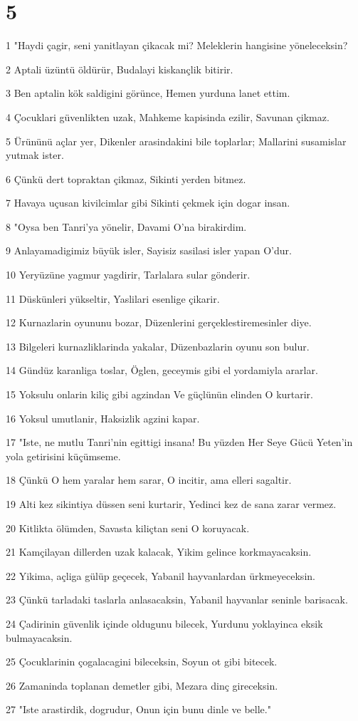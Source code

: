 \chapter{5}

\par 1 "Haydi çagir, seni yanitlayan çikacak mi? Meleklerin hangisine yöneleceksin?
\par 2 Aptali üzüntü öldürür, Budalayi kiskançlik bitirir.
\par 3 Ben aptalin kök saldigini görünce, Hemen yurduna lanet ettim.
\par 4 Çocuklari güvenlikten uzak, Mahkeme kapisinda ezilir, Savunan çikmaz.
\par 5 Ürününü açlar yer, Dikenler arasindakini bile toplarlar; Mallarini susamislar yutmak ister.
\par 6 Çünkü dert topraktan çikmaz, Sikinti yerden bitmez.
\par 7 Havaya uçusan kivilcimlar gibi Sikinti çekmek için dogar insan.
\par 8 "Oysa ben Tanri'ya yönelir, Davami O'na birakirdim.
\par 9 Anlayamadigimiz büyük isler, Sayisiz sasilasi isler yapan O'dur.
\par 10 Yeryüzüne yagmur yagdirir, Tarlalara sular gönderir.
\par 11 Düskünleri yükseltir, Yaslilari esenlige çikarir.
\par 12 Kurnazlarin oyununu bozar, Düzenlerini gerçeklestiremesinler diye.
\par 13 Bilgeleri kurnazliklarinda yakalar, Düzenbazlarin oyunu son bulur.
\par 14 Gündüz karanliga toslar, Öglen, geceymis gibi el yordamiyla ararlar.
\par 15 Yoksulu onlarin kiliç gibi agzindan Ve güçlünün elinden O kurtarir.
\par 16 Yoksul umutlanir, Haksizlik agzini kapar.
\par 17 "Iste, ne mutlu Tanri'nin egittigi insana! Bu yüzden Her Seye Gücü Yeten'in yola getirisini küçümseme.
\par 18 Çünkü O hem yaralar hem sarar, O incitir, ama elleri sagaltir.
\par 19 Alti kez sikintiya düssen seni kurtarir, Yedinci kez de sana zarar vermez.
\par 20 Kitlikta ölümden, Savasta kiliçtan seni O koruyacak.
\par 21 Kamçilayan dillerden uzak kalacak, Yikim gelince korkmayacaksin.
\par 22 Yikima, açliga gülüp geçecek, Yabanil hayvanlardan ürkmeyeceksin.
\par 23 Çünkü tarladaki taslarla anlasacaksin, Yabanil hayvanlar seninle barisacak.
\par 24 Çadirinin güvenlik içinde oldugunu bilecek, Yurdunu yoklayinca eksik bulmayacaksin.
\par 25 Çocuklarinin çogalacagini bileceksin, Soyun ot gibi bitecek.
\par 26 Zamaninda toplanan demetler gibi, Mezara dinç gireceksin.
\par 27 "Iste arastirdik, dogrudur, Onun için bunu dinle ve belle."

